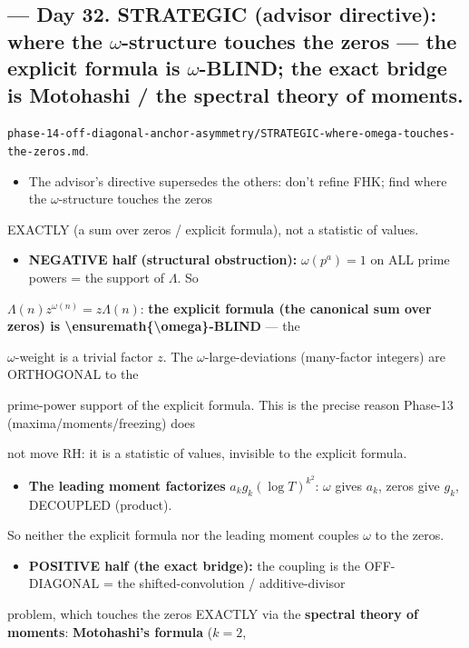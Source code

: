 \documentclass[10pt]{article}
\begin{document}
\subsection*{ --- Day 32. STRATEGIC (advisor directive): where the \ensuremath{\omega}-structure touches the zeros --- the explicit formula is \ensuremath{\omega}-BLIND; the exact bridge is Motohashi / the spectral theory of moments.}
\texttt{phase-14-off-diagonal-anchor-asymmetry/STRATEGIC-where-omega-touches-the-zeros.md}.\par
\begin{itemize}
\item The advisor's directive supersedes the others: don't refine FHK; find where the \ensuremath{\omega}-structure touches the zeros
\end{itemize}
  EXACTLY (a sum over zeros / explicit formula), not a statistic of values.\par
\begin{itemize}
\item \textbf{NEGATIVE half (structural obstruction):} $\omega(p^a)=1$ on ALL prime powers = the support of $\Lambda$. So
\end{itemize}
  $\Lambda(n)z^{\omega(n)}=z\Lambda(n)$: \textbf{the explicit formula (the canonical sum over zeros) is \textbackslash{}ensuremath\{\textbackslash{}omega\}-BLIND} --- the\par
  \ensuremath{\omega}-weight is a trivial factor $z$. The \ensuremath{\omega}-large-deviations (many-factor integers) are ORTHOGONAL to the\par
  prime-power support of the explicit formula. This is the precise reason Phase-13 (maxima/moments/freezing) does\par
  not move RH: it is a statistic of values, invisible to the explicit formula.\par
\begin{itemize}
\item \textbf{The leading moment factorizes} $a_k g_k(\log T)^{k^2}$: \ensuremath{\omega} gives $a_k$, zeros give $g_k$, DECOUPLED (product).
\end{itemize}
  So neither the explicit formula nor the leading moment couples \ensuremath{\omega} to the zeros.\par
\begin{itemize}
\item \textbf{POSITIVE half (the exact bridge):} the coupling is the OFF-DIAGONAL = the shifted-convolution / additive-divisor
\end{itemize}
  problem, which touches the zeros EXACTLY via the \textbf{spectral theory of moments}: \textbf{Motohashi's formula} ($k=2$,\par
\end{document}
